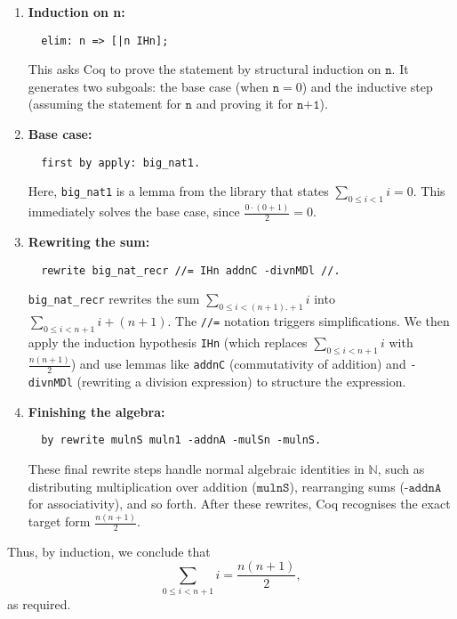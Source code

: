 \documentclass[letterpaper]{article}
\begin{document}
\begin{enumerate}
  \item \textbf{Induction on n:}
  \begin{lstlisting}
  elim: n => [|n IHn];
  \end{lstlisting}
  This asks Coq to prove the statement by structural induction on \(\texttt{n}\). 
  It generates two subgoals: the base case (when \(\texttt{n} = 0\)) and the 
  inductive step (assuming the statement for \(\texttt{n}\) and proving it for 
  \(\texttt{n+1}\)).
  
  \item \textbf{Base case:} 
  \begin{lstlisting}
  first by apply: big_nat1.
  \end{lstlisting}
  Here, \texttt{big\_nat1} is a lemma from the library that states 
  \(\sum_{0 \le i < 1} i = 0\). This immediately solves the base case, since 
  \(\frac{0 \cdot (0+1)}{2} = 0\).

  \item \textbf{Rewriting the sum:}
  \begin{lstlisting}
  rewrite big_nat_recr //= IHn addnC -divnMDl //.
  \end{lstlisting}
  \texttt{big\_nat\_recr} rewrites the sum 
  \(\sum_{0 \le i < (n+1).+1} i\) into \(\sum_{0 \le i < n+1} i + (n+1)\). 
  The \texttt{//=} notation triggers simplifications. We then apply the induction
  hypothesis \texttt{IHn} (which replaces \(\sum_{0 \le i < n+1} i\) with 
  \(\frac{n(n+1)}{2}\)) and use lemmas like \texttt{addnC} (commutativity of 
  addition) and \texttt{-divnMDl} (rewriting a division expression) to structure 
  the expression.

  \item \textbf{Finishing the algebra:}
  \begin{lstlisting}
  by rewrite mulnS muln1 -addnA -mulSn -mulnS.
  \end{lstlisting}
  These final rewrite steps handle normal algebraic identities in \(\mathbb{N}\), 
  such as distributing multiplication over addition (\(\texttt{mulnS}\)), 
  rearranging sums (\(\texttt{-addnA}\) for associativity), and so forth. 
  After these rewrites, Coq recognises the exact target form \(\frac{n(n+1)}{2}\).

\end{enumerate}

\noindent
Thus, by induction, we conclude that
\[
  \sum_{0 \le i < n+1} i = \frac{n(n+1)}{2},
\]
as required.


\pagebreak


\end{document}
